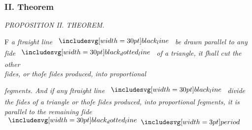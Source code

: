 \documentclass[12pt,preview]{standalone}
\begin{document}
\subsubsection{II. Theorem}

\begin{minipage}[t]{0.33\textwidth}
    \vspace{40pt}
    
\end{minipage}%
\hfill
\begin{minipage}[t]{0.64\textwidth}
    \vspace{0pt}

    \begin{center}
        \textit{PROPOSITION II. THEOREM.}\label{book6pr2} \\
    \end{center}

    \hfill

    \begin{center}
        \raggedright \lettrine[lines=4, loversize=1, nindent=0pt]{}{}F \textit{a ſtraight line} $\blackline$ \textit{be drawn parallel to any\\ ſide} $\dottedblackline$ \textit{of a triangle, it ſhall cut the other\\ ſides, or thoſe ſides produced, into proportional}
    \end{center}
    \vspace{1ex}
    \raggedright \textit{ſegments. And if any ſtraight line} $\blackline$ \textit{divide the ſides of a triangle or thoſe ſides produced, into proportional ſegments, it is parallel to the remaining ſide} $\dottedblackline \bperiod$

    \hfill

    \hfill


\end{minipage}
\end{document}

